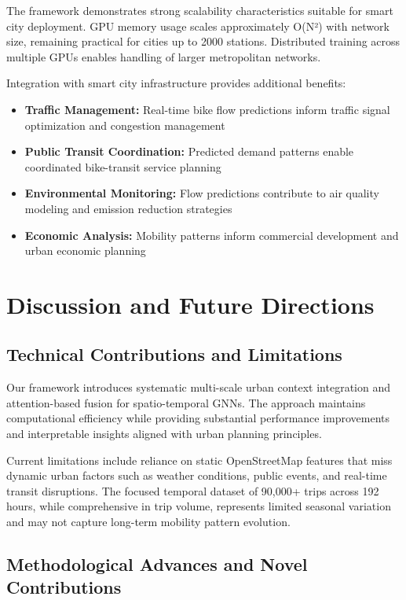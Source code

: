 \documentclass[sigconf,review,nonacm]{acmart}
\begin{document}
The framework demonstrates strong scalability characteristics suitable for smart city deployment. GPU memory usage scales approximately O(N²) with network size, remaining practical for cities up to 2000 stations. Distributed training across multiple GPUs enables handling of larger metropolitan networks.

Integration with smart city infrastructure provides additional benefits:
\begin{itemize}
\item \textbf{Traffic Management:} Real-time bike flow predictions inform traffic signal optimization and congestion management
\item \textbf{Public Transit Coordination:} Predicted demand patterns enable coordinated bike-transit service planning
\item \textbf{Environmental Monitoring:} Flow predictions contribute to air quality modeling and emission reduction strategies
\item \textbf{Economic Analysis:} Mobility patterns inform commercial development and urban economic planning
\end{itemize}

\section{Discussion and Future Directions}

\subsection{Technical Contributions and Limitations}

Our framework introduces systematic multi-scale urban context integration and attention-based fusion for spatio-temporal GNNs. The approach maintains computational efficiency while providing substantial performance improvements and interpretable insights aligned with urban planning principles.

Current limitations include reliance on static OpenStreetMap features that miss dynamic urban factors such as weather conditions, public events, and real-time transit disruptions. The focused temporal dataset of 90,000+ trips across 192 hours, while comprehensive in trip volume, represents limited seasonal variation and may not capture long-term mobility pattern evolution.

\subsection{Methodological Advances and Novel Contributions}
\end{document}
